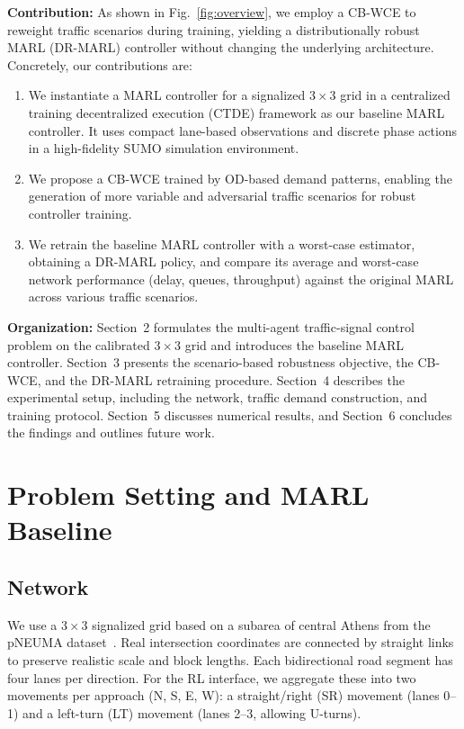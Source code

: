 \documentclass{ifacconf}
\newcommand{\1}{\mbox{1}\hspace{-0.25em}\mbox{l}}
\begin{document}
\textbf{Contribution:}
As shown in Fig.~\ref{fig:overview}, we employ a CB-WCE to reweight traffic scenarios during training, yielding a distributionally robust MARL (DR-MARL) controller without changing the underlying architecture. Concretely, our contributions are:
\begin{enumerate}
  \item We instantiate a MARL controller for a signalized \(3\times 3\) grid in a centralized training decentralized execution (CTDE) framework as our baseline MARL controller. It uses compact lane-based observations and discrete phase actions in a high-fidelity SUMO simulation environment.
  \item We propose a CB-WCE trained by OD-based demand patterns, enabling the generation of more variable and adversarial traffic scenarios for robust controller training.
  \item  We retrain the baseline MARL controller with a worst-case estimator, obtaining a DR-MARL policy, and compare its average and worst-case network performance (delay, queues, throughput) against the original MARL across various traffic scenarios.
 
\end{enumerate}



\textbf{Organization:}
Section~2 formulates the multi-agent traffic-signal control problem on the calibrated \(3\times 3\) grid and introduces the baseline MARL controller. Section~3 presents the scenario-based robustness objective, the CB-WCE, and the DR-MARL retraining procedure. Section~4 describes the experimental setup, including the network, traffic demand construction, and training protocol. Section~5 discusses numerical results, and Section~6 concludes the findings and outlines future work.




\section{Problem Setting and MARL Baseline}
\label{sec:problem}

\subsection{Network}
\label{subsec:network-signal}
We use a $3\times3$ signalized grid based on a subarea of central Athens from the pNEUMA dataset~\citep{BarmpounakisGeroliminis2020}. Real intersection coordinates are connected by straight links to preserve realistic scale and block lengths. Each bidirectional road segment has four lanes per direction. For the RL interface, we aggregate these into two movements per approach (N, S, E, W): a straight/right (SR) movement (lanes 0--1) and a left-turn (LT) movement (lanes 2--3, allowing U-turns).
\end{document}
